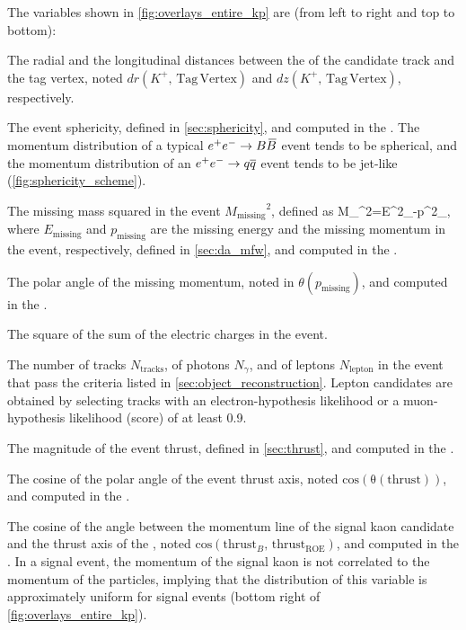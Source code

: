 The variables shown in \cref{fig:overlays_entire_kp} are (from left to right and top to bottom):
\bi
\item The radial and the longitudinal distances between the \POCA of the \Kp candidate track and the tag vertex, noted $dr(K^+,\,\mathrm{Tag\,Vertex})$ and $dz(K^+,\,\mathrm{Tag\,Vertex})$, respectively.
\item The event sphericity, defined in \cref{sec:sphericity}, and computed in the \CMS.
The momentum distribution of a typical $e^+e^-\rightarrow B\kern 0.18em\overline{\kern -0.18em B}{}$ event tends to be spherical, and the momentum distribution of an $e^+e^-\rightarrow q\overline q$ event tends to be jet-like (\cref{fig:sphericity_scheme}).
\item The missing mass squared in the event ${M_{\mathrm{missing}}}^2$, defined as
\be
{M_{}}^2=E^2_{}-p^2_{},
\ee
where $E_{\mathrm{missing}}$ and $p_{\mathrm{missing}}$ are the missing energy and the missing momentum in the event, respectively, defined in \cref{sec:da_mfw}, and computed in the \CMS.
\item The polar angle of the missing momentum, noted in $\theta(p_{\mathrm{missing}})$, and computed in the \CMS.
\item The square of the sum of the electric charges in the event.
\item The number of tracks $N_{\mathrm{tracks}}$, of photons $N_{\gamma}$, and of leptons $N_{\mathrm{lepton}}$ in the event that pass the criteria listed in \cref{sec:object_reconstruction}.
Lepton candidates are obtained by selecting tracks with an electron-hypothesis likelihood or a muon-hypothesis likelihood (\PID score) of at least 0.9.
\item The magnitude of the event thrust, defined in \cref{sec:thrust}, and computed in the \CMS.
\item The cosine of the polar angle of the event thrust axis, noted $\mathrm{cos(\theta(thrust))}$, and computed in the \CMS.
\item The cosine of the angle between the momentum line of the signal kaon candidate and the thrust axis of the \ROE, noted $\mathrm{cos}(\mathrm{thrust}_B,\,\mathrm{thrust_{ROE}})$, and computed in the \CMS.
In a signal event, the momentum of the signal kaon is not correlated to the momentum of the \ROE particles, implying that the distribution of this variable is approximately uniform for signal events (bottom right of \cref{fig:overlays_entire_kp}).
\ei

